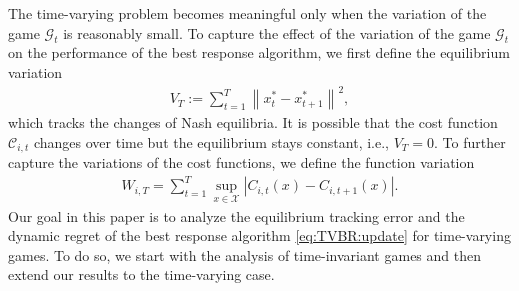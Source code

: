 The time-varying  problem becomes meaningful only when the variation of the game $\mathcal{G}_t$ is reasonably small.
To capture the effect of the variation of the game $\mathcal{G}_t$ on the performance of the best response algorithm, we first define the equilibrium variation
%
\begin{align}\label{eq:def:VT}
    V_T:=\sum_{t=1}^T\left\|x_{t}^{*}- x_{t+1}^{*}  \right\|^2,
\end{align}
%
which tracks the changes of Nash equilibria.
%
It is possible that the cost function $ \mathcal{C}_{i,t}$ changes over time but the equilibrium stays constant, i.e., $V_T=0$. 
To further capture the variations of the cost functions, we define the function variation 
\begin{align}\label{eq:def:WT}
    W_{i,T} = \sum_{t=1}^T \sup_{x\in\mathcal{X}}|C_{i,t}(x) - C_{i,t+1}(x)|.
\end{align}
%
Our goal in this paper is to analyze the equilibrium tracking error and the dynamic regret of the best response algorithm \eqref{eq:TVBR:update} for time-varying games. To do so, we start with the analysis of time-invariant games and then extend our results to the time-varying case.


